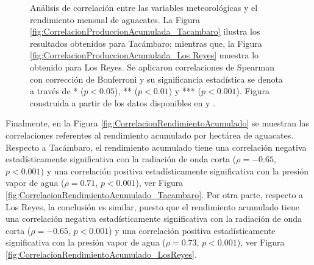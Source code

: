 \begin{figure}[ht]
{}
\caption{Análisis de correlación entre las variables meteorológicas y el rendimiento mensual de aguacates. La Figura \ref{fig:CorrelacionProduccionAcumulada_Tacambaro} ilustra los resultados obtenidos para Tacámbaro; mientras que, la Figura \ref{fig:CorrelacionProduccionAcumulada_Los Reyes} muestra lo obtenido para Los Reyes. Se aplicaron correlaciones de Spearman con corrección de Bonferroni y su significancia estadística se denota a través de * ($p<0.05$), ** ($p<0.01$) y *** ($p<0.001$). Figura construida a partir de los datos disponibles en \cite{AvanceSiembrasCosechas} y \cite{Rodriguez-Moreno_2021}.}
\label{fig:CorrelacionRendimientoMensual}
\end{figure}

Finalmente, en la Figura \ref{fig:CorrelacionRendimientoAcumulado} se muestran las correlaciones referentes al rendimiento acumulado por hectárea de aguacates. Respecto a Tacámbaro, el rendimiento acumulado tiene una correlación negativa estadísticamente significativa con la radiación de onda corta ($\rho =-0.65$, $p<0.001$) y una correlación positiva estadísticamente significativa con la presión vapor de agua ($\rho = 0.71$, $p<0.001$), ver Figura \ref{fig:CorrelacionRendimientoAcumulado_Tacambaro}. Por otra parte, respecto a Los Reyes, la conclusión es similar, puesto que el rendimiento acumulado tiene una correlación negativa estadísticamente significativa con la radiación de onda corta ($\rho =-0.65$, $p<0.001$) y una correlación positiva estadísticamente significativa con la presión vapor de agua ($\rho = 0.73$, $p<0.001$), ver Figura \ref{fig:CorrelacionRendimientoAcumulado_LosReyes}.\\

